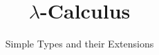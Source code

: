 
\title{\texorpdfstring{$\lambda$}{λ}-Calculus}
\subtitle{Simple Types and their Extensions}


\bgroup
  \begin{frame}
    \maketitle
  \end{frame}
\egroup

